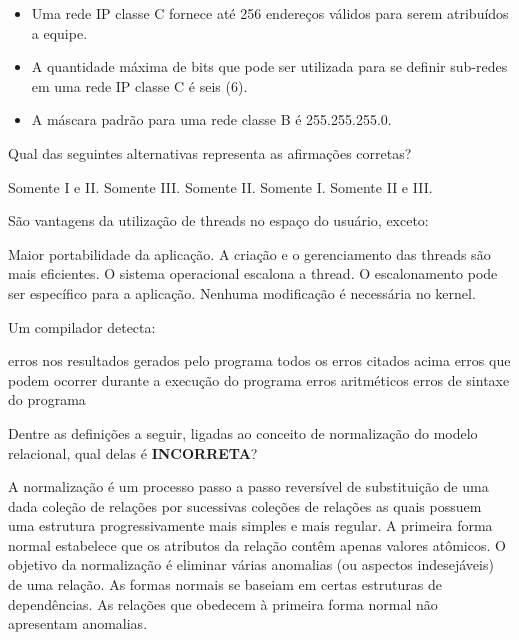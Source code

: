 \documentclass[12pt, addpoints]{exam}
\begin{document}
\begin{questions}
\begin{itemize}

    \item[I.] Uma rede IP classe C fornece até 256 endereços válidos para serem atribuídos a equipe.

    \item[II.] A quantidade máxima de bits que pode ser utilizada para se definir sub-redes em uma rede IP classe C é seis (6).

    \item[III.] A máscara padrão para uma rede classe B é 255.255.255.0.

\end{itemize}

Qual das seguintes alternativas representa as afirmações corretas?
\begin{choices}
\choice Somente I e II.
\choice Somente III.
\choice Somente II.
\choice Somente I.
\choice Somente II e III.
\end{choices}

\question

São vantagens da utilização de threads no espaço do usuário, exceto:
\begin{choices}
\choice Maior portabilidade da aplicação.
\choice A criação e o gerenciamento das threads são mais eficientes.
\choice O sistema operacional escalona a thread.
\choice O escalonamento pode ser específico para a aplicação.
\choice Nenhuma modificação é necessária no kernel.
\end{choices}

\question

Um compilador detecta:
\begin{choices}
\choice erros nos resultados gerados pelo programa
\choice todos os erros citados acima
\choice erros que podem ocorrer durante a execução do programa
\choice erros aritméticos
\choice erros de sintaxe do programa 
\end{choices}

\question

Dentre as definições a seguir, ligadas ao conceito de normalização do modelo relacional, qual delas é \textbf{INCORRETA}?


\begin{choices}
\choice A normalização é um processo passo a passo reversível de substituição de uma dada coleção de relações por sucessivas coleções de relações as quais possuem uma estrutura progressivamente mais simples e mais regular.
\choice A primeira forma normal estabelece que os atributos da relação contêm apenas valores atômicos.
\choice O objetivo da normalização é eliminar várias anomalias (ou aspectos indesejáveis) de uma relação.
\choice As formas normais se baseiam em certas estruturas de dependências.
\choice As relações que obedecem à primeira forma normal não apresentam anomalias.
\end{choices}


\end{questions}
\end{document}
